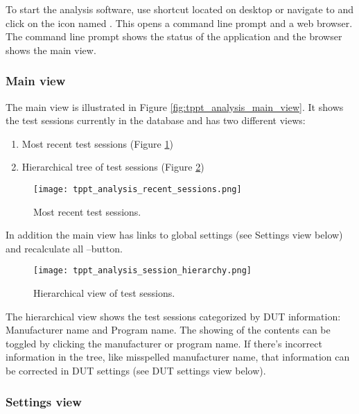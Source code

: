 To start the analysis software, use shortcut located on desktop or navigate to \texttt{\tntRootPath\tntTPPTAnalysisFolder} and click on the icon named \texttt{\tntTPPTAnalysisExecutable}. This opens a command line prompt and a web browser. The command line prompt shows the status of the application and the browser shows the main view.

\subsubsection{Main view}

The main view is illustrated in Figure \ref{fig:tppt_analysis_main_view}. It shows the test sessions currently in the database and has two different views:
\begin{enumerate}
\item Most recent test sessions (Figure \ref{fig:tppt_analysis_recent_sessions})
\item Hierarchical tree of test sessions (Figure \ref{fig:tppt_analysis_session_hierarchy})
\end{enumerate}

\begin{figure}[!h]
	\centering
	\texttt{[image: tppt\_analysis\_recent\_sessions.png]}
	\caption{Most recent test sessions.}
	\label{fig:tppt_analysis_recent_sessions}
\end{figure}

In addition the main view has links to global settings (see Settings view below) and recalculate all –button.

\begin{figure}[!h]
	\centering
	\texttt{[image: tppt\_analysis\_session\_hierarchy.png]}
	\caption{Hierarchical view of test sessions.}
	\label{fig:tppt_analysis_session_hierarchy}
\end{figure}

The hierarchical view shows the test sessions categorized by DUT information: Manufacturer name and Program name. The showing of the contents can be toggled by clicking the manufacturer or program name.
If there's incorrect information in the tree, like misspelled manufacturer name, that information can be corrected in DUT settings (see DUT settings view below).

\subsubsection{\label{sec:settings_view}Settings view}


